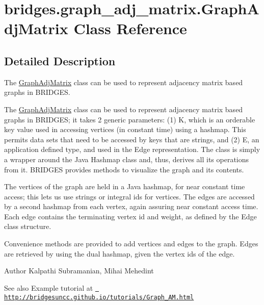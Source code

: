 \hypertarget{classbridges_1_1graph__adj__matrix_1_1_graph_adj_matrix}{}\section{bridges.\+graph\+\_\+adj\+\_\+matrix.\+Graph\+Adj\+Matrix Class Reference}
\label{classbridges_1_1graph__adj__matrix_1_1_graph_adj_matrix}


\subsection{Detailed Description}
The \mbox{\hyperlink{classbridges_1_1graph__adj__matrix_1_1_graph_adj_matrix}{Graph\+Adj\+Matrix}} class can be used to represent adjacency matrix based graphs in B\+R\+I\+D\+G\+ES. 

The \mbox{\hyperlink{classbridges_1_1graph__adj__matrix_1_1_graph_adj_matrix}{Graph\+Adj\+Matrix}} class can be used to represent adjacency matrix based graphs in B\+R\+I\+D\+G\+ES; it takes 2 generic parameters\+: (1) K, which is an orderable key value used in accessing vertices (in constant time) using a hashmap. This permits data sets that need to be accessed by keys that are strings, and (2) E, an application defined type, and used in the Edge representation. The class is simply a wrapper around the Java Hashmap class and, thus, derives all its operations from it. B\+R\+I\+D\+G\+ES provides methods to visualize the graph and its contents.

The vertices of the graph are held in a Java hashmap, for near constant time access; this lets us use strings or integral ids for vertices. The edges are accessed by a second hashmap from each vertex, again assuring near constant access time. Each edge contains the terminating vertex id and weight, as defined by the Edge class structure.

Convenience methods are provided to add vertices and edges to the graph. Edges are retrieved by using the dual hashmap, given the vertex ids of the edge.

\begin{DoxyAuthor}{Author}
Kalpathi Subramanian, Mihai Mehedint
\end{DoxyAuthor}
\begin{DoxySeeAlso}{See also}
Example tutorial at \href{http://bridgesuncc.github.io/tutorials/Graph_AM.html}{\texttt{ http\+://bridgesuncc.\+github.\+io/tutorials/\+Graph\+\_\+\+A\+M.\+html}} 
\end{DoxySeeAlso}
